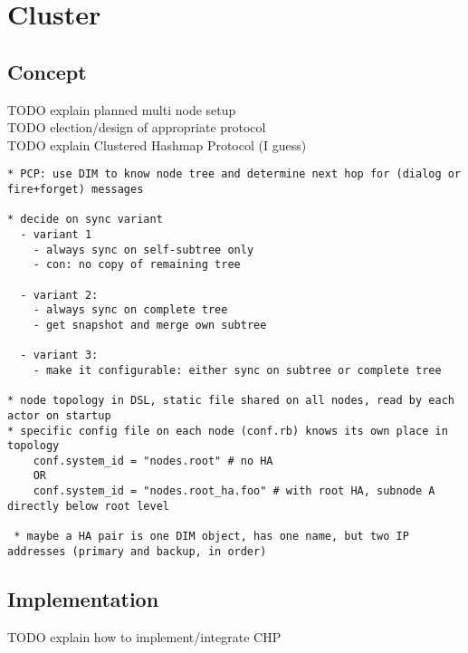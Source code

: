 \chapter{Cluster}\label{ch:cluster}
\section{Concept}
TODO explain planned multi node setup\\
TODO election/design of appropriate protocol\\
TODO explain Clustered Hashmap Protocol (I guess)\\


\begin{lstlisting}[style=customsh]
* PCP: use DIM to know node tree and determine next hop for (dialog or fire+forget) messages

* decide on sync variant
  - variant 1
    - always sync on self-subtree only
    - con: no copy of remaining tree

  - variant 2:
    - always sync on complete tree
    - get snapshot and merge own subtree

  - variant 3:
    - make it configurable: either sync on subtree or complete tree

* node topology in DSL, static file shared on all nodes, read by each actor on startup
* specific config file on each node (conf.rb) knows its own place in topology
    conf.system_id = "nodes.root" # no HA
    OR
    conf.system_id = "nodes.root_ha.foo" # with root HA, subnode A directly below root level

 * maybe a HA pair is one DIM object, has one name, but two IP addresses (primary and backup, in order)
\end{lstlisting}

\section{Implementation}
TODO explain how to implement/integrate CHP

